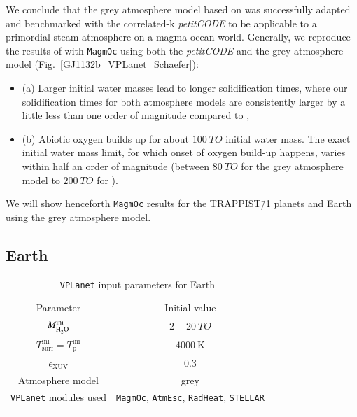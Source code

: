\documentclass[oneside,twocolumn]{article}
\newcommand{\vplanet}{\texttt{\footnotesize{VPLanet}}}
\newcommand{\atmesc}{\texttt{\footnotesize{AtmEsc}}}
\newcommand{\radheat}{\texttt{\footnotesize{RadHeat}}}
\newcommand{\stellar}{\texttt{\footnotesize{STELLAR}}}
\newcommand{\magmoc}{\texttt{\footnotesize{MagmOc}}}
\newcommand{\petit}{\textit{petitCODE}}
\begin{document}
We conclude that the grey atmosphere model based on \citet{Elkins-Tanton2008, Carone2014} was successfully adapted and benchmarked with the correlated-k \petit{} \citep{Molliere2015, Molliere2017} to be applicable to a primordial steam atmosphere on a magma ocean world. 
Generally, we reproduce the results of \citet{Schaefer2016} with \magmoc{} using both the \petit{} and the grey atmosphere model (Fig.~\ref{GJ1132b_VPLanet_Schaefer}): 
\begin{itemize}
    \item (a) Larger initial water masses lead to longer solidification times, where our solidification times for both atmosphere models are consistently larger by a little less than one order of magnitude compared to \citet{Schaefer2016},  
    \item (b) Abiotic oxygen builds up for about $\SI{100}{TO}$ initial water mass. The exact initial water mass limit, for which onset of oxygen build-up happens, varies within half an order of magnitude (between $\SI{80}{TO}$ for the grey atmosphere model to $\SI{200}{TO}$ for \citet{Schaefer2016}).
\end{itemize}
We will show henceforth \magmoc{} results for the TRAPPIST\=/1 planets and Earth using the grey atmosphere model.

\subsection{Earth}
\label{sec: Earth}

\begin{table}[ht]
    \caption{\vplanet{} input parameters for Earth}
	\begin{tabular}{cc}
		\noalign{\smallskip}
		\hline
		\noalign{\smallskip}
		Parameter & Initial value\\ 
		\noalign{\smallskip}
		\hline \hline
		\noalign{\smallskip}
		$M_{\ce{H2O}}^\mathrm{ini} $ & $2-\SI{20}{TO}$ \\
		$T_\mathrm{surf}^\mathrm{ini} = T_\mathrm{p}^\mathrm{ini} $ & $\SI{4000}{\kelvin}$ \\
		$\epsilon_\mathrm{XUV}$ & 0.3  \\ 
		Atmosphere model & grey \\
		\vplanet{} modules used & \magmoc{}, \atmesc{}, \radheat{}, \stellar{} \\
		\noalign{\smallskip}
		\hline
	\end{tabular}
	\label{Tab_Input_Earth}
\end{table}
\end{document}
